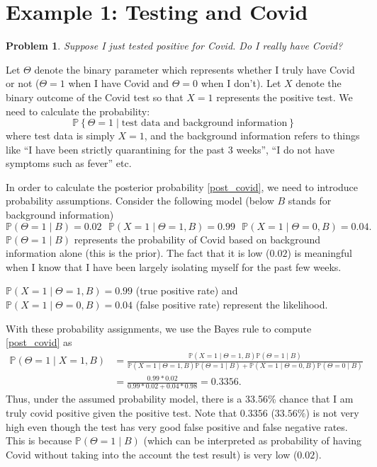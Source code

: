 \documentclass{scrartcl}
\newtheorem{problem}[theorem]{Problem}
\newcommand{\P}{{\mathbb P}}
\begin{document}
\section{Example 1: Testing and Covid}
\begin{problem}
  Suppose I just tested positive for Covid. Do I really have Covid?
\end{problem}

Let $\Theta$ denote the binary parameter which represents whether I
truly have Covid or not ($\Theta = 1$ when I have Covid and $\Theta =
0$ when I don't). Let $X$ denote the binary outcome of the Covid test
so that $X = 1$ represents the positive test. We need to calculate the
probability:
\begin{equation}\label{post_covid}
  \P \left\{\Theta = 1 \mid \text{test data} \text{ and } \text{background
      information} \right\} 
\end{equation}
where test data is simply $X = 1$, and the background information
refers to things like ``I have been strictly
quarantining for the past 3 weeks'', ``I do not have symptoms such as
fever'' etc.

In order to calculate the posterior probability \eqref{post_covid}, we
need to introduce probability assumptions. Consider the following
model (below $B$ stands for background information)
\begin{equation}\label{cancer_assign}
  \P(\Theta = 1 \mid B) = 0.02 ~~~ \P(X = 1\mid \Theta = 1, B) = 0.99 ~~~
  \P(X = 1 \mid \Theta = 0, B) = 0.04. 
\end{equation}
$\P(\Theta = 1 \mid B)$ represents the probability of Covid based on
background information alone (this is the prior). The fact that it is
low ($0.02$) is meaningful when I know that I have been largely
isolating myself for the past few weeks.

$\P(X = 1 \mid \Theta = 1, B) = 0.99$ (true positive rate) and $\P(X =
1 \mid \Theta = 0, B) = 0.04$ (false positive rate) represent the
likelihood. 

With these probability assignments, we use the Bayes rule to compute 
\eqref{post_covid} as
\begin{align*}
  \P(\Theta = 1 \mid X = 1, B) &= \frac{\P(X  = 1 
                    \mid \Theta = 1, B) \P(\Theta = 1 \mid B)}{\P(X = 1
                    \mid \Theta = 1, B) \P(\Theta = 1 \mid B) + \P(X = 1
                                 \mid \Theta = 0, B) \P(\Theta = 0 \mid B)} \\
  &= \frac{0.99 *
      0.02}{0.99 * 0.02 + 0.04*0.98} = 0.3356. 
\end{align*}
Thus, under the assumed probability model, there is a 33.56\% chance
that I am truly covid positive given the positive test. Note that
$0.3356$ ($33.56 \%$) is not very high even 
  though the test has very good false positive and false negative
  rates. This is because $\P(\Theta = 1 \mid B)$ (which can be
  interpreted as probability of having Covid without taking into the
  account the test result) is very low   ($0.02$). 
\end{document}

